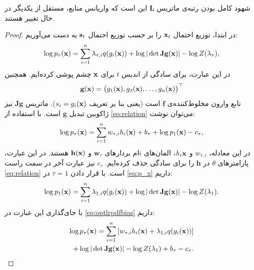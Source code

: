 \documentclass[oneside]{thesis}
\begin{document}
\begin{note}
	شهود کامل بودن رتبه‌ی ماتریس 
	$\mathbf{L}$
	این است که واریانس منابع، مستقل از یکدیگر در حال تغییر هستند.
\end{note}
\begin{proof}
	در ابتدا، توزیع احتمال 
	$\mathbf{x}_t$
	را بر حسب توزیع احتمال
	$\mathbf{s}_t$
	به دست می‌آوریم:
	\begin{equation}
	\log p_\tau(\mathbf{x}) = \sum_{i=1}^n \lambda_{\tau,i}q(g_i(\mathbf{x})) 
	+ \log | \det  \mathbf{J} \mathbf{g} (\mathbf{x}) | - \log Z(\lambda_\tau),
	\label{eq:p_x}
	\end{equation}
	در این عبارت، برای سادگی از اندیس 
	$t$ 
	برای
	$\mathbf{x}$
	چشم پوشی کرده‌ایم. همچنین
	\begin{equation}
	\mathbf{g}(\mathbf{x}) = \big(g_1(\mathbf{x}), g_2(\mathbf{x}), \dots, g_n(\mathbf{x})\big)^\top
	\end{equation}
	تابع وارون مخلوط‌کننده‌ی
	$\mathbf{f}$
	است (یعنی بنا بر تعریف
	$s_i = g_i(\mathbf{x})$).
	ماتریس 
	$\mathbf{Jg}$
	نیز ژاکوبین تبدیل 
	$\mathbf{g}$
	است. با استفاده از 
	\eqref{eq:relation}
	می‌توان نوشت:
	\begin{equation} 
	\log p_\tau(\mathbf{x})= \sum_{i=1}^n w_{\tau,i} h_i(\mathbf{x}) + b_\tau + \log p_1(\mathbf{x}) - c_\tau,
	\label{eq:optlrpdfbias}
	\end{equation}
	در این معادله، 
	$w_{\tau, i}$
	و
	$h_i{\mathbf{x}}$،
	المان‌های 
	$i$ام
	بردار‌های 
	$\mathbf{w}_\tau$
	و
	$\mathbf{h}(\mathbf{x})$
	هستند. در این عبارت، پارامتر‌های
	$\theta$
	در 
	$\mathbf{h}$
	را برای سادگی حذف کرده‌ایم. 
	$c_\tau$
	نیز عبارت آخر در سمت راست
	\eqref{eq:relation}
	است. با قرار دادن 
	$\tau = 1$
	در 
	\eqref{eq:p_x}
	داریم:
	\begin{equation}
	\log p_1(\mathbf{x})= \sum_{i=1}^n \lambda_{1,i} q(g_i(\mathbf{x})) + \log |\det \mathbf{ J g}(\mathbf{x})| - \log Z(\lambda_1).
	\label{eq:p1_x}
	\end{equation} 
	با جای‌گذاری این عبارت در 
	\eqref{eq:optlrpdfbias}
	داریم:
	\begin{align} \label{eq:optlrpdf2}
	\log p_\tau(\mathbf{x}) = \sum_{i=1}^n \left[w_{\tau,i} h_i(\mathbf{x}) + \lambda_{1,i} q(g_i(\mathbf{x})) \right] \\
	+ \log |\det\mathbf{ J g}(\mathbf{x})| - \log Z(\lambda_1)  + b_\tau - c_\tau.
	\end{align}
	

\end{proof}
\end{document}
